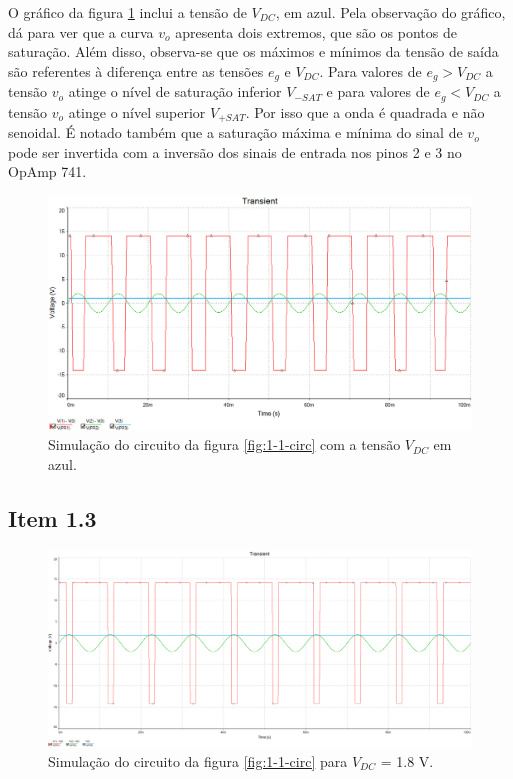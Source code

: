 \documentclass[11pt]{article}
\begin{document}
O gráfico da figura \ref{fig:1-2} inclui a tensão de $V_{DC}$, em azul. Pela observação do gráfico, dá para ver que a curva $v_{o}$ apresenta dois extremos, que são os pontos de saturação. Além disso, observa-se que os máximos e mínimos da tensão de saída são referentes à diferença entre as tensões  $e_{g}$ e $V_{DC}$. Para valores de $e_{g} > V_{DC}$ a tensão $v_{o}$ atinge o nível de saturação inferior $V_{-SAT}$ e para valores de $e_{g} < V_{DC}$ a tensão $v_{o}$ atinge o nível superior $V_{+SAT}$. Por isso que a onda é quadrada e não senoidal. É notado também que a saturação máxima e mínima do sinal de $v_{o}$ pode ser invertida com a inversão dos sinais de entrada nos pinos 2 e 3 no OpAmp 741.

\begin{figure}[h!]
  \centering
  \includegraphics[width=\textwidth]{fig/sim1_vdc}
  \caption{Simulação do circuito da figura \ref{fig:1-1-circ} com a tensão $V_{DC}$ em azul.}
  \label{fig:1-2}
\end{figure}

\subsection*{Item 1.3}

\begin{figure}[h!]
  \centering
  \includegraphics[width=\textwidth]{fig/sim1_3}
  \caption{Simulação do circuito da figura \ref{fig:1-1-circ} para $V_{DC}$ = 1.8 V.}
  \label{fig:1-3}
\end{figure}
\end{document}
